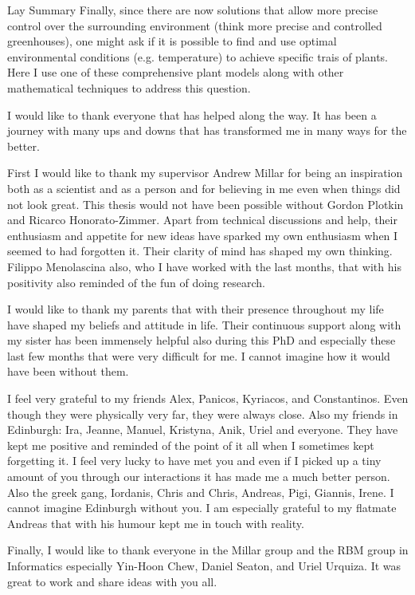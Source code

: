 \documentclass[phd, logo]{infthesis}
\newcommand{\eg}{e.g.\xspace}
\begin{document}
\begin{preliminary}
\begin{frontenv}{Lay Summary}{\LARGE}
    Finally, since there are now solutions that allow more precise control over
    the surrounding environment (think more precise and controlled greenhouses),
    one might ask if it is possible to find and use optimal environmental
    conditions (\eg temperature) to achieve specific trais of plants. Here I use
    one of these comprehensive plant models along with other mathematical
    techniques to address this question.
\end{frontenv}\newpage

  \begin{acknowledgements}
I would like to thank everyone that has helped along the way. It has been a
journey with many ups and downs that has transformed me in many ways for the better.

First I would like to thank my supervisor Andrew Millar for being an inspiration
both as a scientist and as a person and for believing in me even when things
did not look great. This thesis would not have been possible without Gordon
Plotkin and Ricarco Honorato-Zimmer. Apart from technical discussions and help,
their enthusiasm and appetite for new ideas have sparked my own enthusiasm when
I seemed to had forgotten it. Their clarity of mind has shaped my own
thinking. Filippo Menolascina also, who I have worked with the last months, that
with his positivity also reminded of the fun of doing research.

I would like to thank my parents that with their presence throughout my life
have shaped my beliefs and attitude in life. Their continuous support along
with my sister has been immensely helpful also during this PhD and especially
these last few months that were very difficult for me. I cannot imagine how it
would have been without them.

I feel very grateful to my friends Alex, Panicos, Kyriacos, and
Constantinos. Even though they were physically very far, they were always
close. Also my friends in Edinburgh: Ira, Jeanne, Manuel, Kristyna, Anik, Uriel
and everyone. They have kept me positive and reminded of the point of it all
when I sometimes kept forgetting it. I feel very lucky to have met you and even
if I picked up a tiny amount of you through our interactions it has made me a
much better person. Also the greek gang, Iordanis, Chris and Chris, Andreas,
Pigi, Giannis, Irene. I cannot imagine Edinburgh without you. I am especially
grateful to my flatmate Andreas that with his humour kept me in touch with
reality.

Finally, I would like to thank everyone in the Millar group and the RBM group in
Informatics especially Yin-Hoon Chew, Daniel Seaton, and Uriel Urquiza. It was
great to work and share ideas with you all.

\end{acknowledgements}

\standarddeclaration

\tableofcontents

\end{preliminary}
\end{document}
